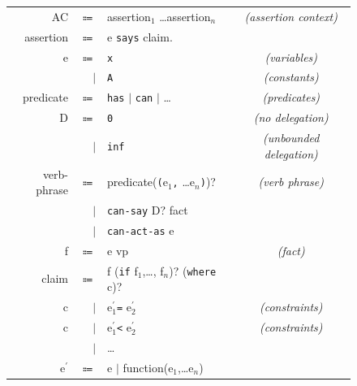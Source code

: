 \documentclass[thesis.tex]{subfiles}
\begin{document}
\newcommand{\bnfcomment}[1]{\slshape{\sffamily(#1)}}
\newcommand{\secpal}[1]{{\color{BrickRed}\texttt{#1}}}
\begin{figure}\footnotesize\centering\sffamily
  \begin{tabular}{r r l c}
    AC         & $\Coloneqq$ & assertion$_1$ \dots assertion$_n$                      & \bnfcomment{assertion context} \\
    assertion  & $\Coloneqq$ & e \secpal{says} claim.                          \\
    e          & $\Coloneqq$ & \secpal{x}                                       & \bnfcomment{variables}         \\
               & $\vert$     & \secpal{A}                                       & \bnfcomment{constants}         \\
    predicate  & $\Coloneqq$ & \secpal{has} $\vert$ \secpal{can} $\vert$ \dots  & \bnfcomment{predicates}        \\
    D          & $\Coloneqq$ & \secpal{0}                                               & \bnfcomment{no delegation}     \\
               & $\vert$     & \secpal{inf}                                        & \bnfcomment{unbounded delegation}        \\
    verb-phrase& $\Coloneqq$ & predicate(\secpal{(}e$_1$\secpal{,} \dots e$_n$\secpal{)})?                          & \bnfcomment{verb phrase}       \\
               & $\vert$     & \secpal{can-say} D? fact                       \\
               & $\vert$     & \secpal{can-act-as}  e                          \\
    f          & $\Coloneqq$ & e vp                                             & \bnfcomment{fact}              \\
    claim      & $\Coloneqq$ & f (\secpal{if} f$_1$,\dots, f$_n$)? (\secpal{where} c)?             \\
    c          & $\vert$     & e$^\prime_1 $\secpal{=} e$^\prime_2$                      & \bnfcomment{constraints}       \\
    c          & $\vert$     & e$^\prime_1 $\secpal{<} e$^\prime_2$                      & \bnfcomment{constraints}       \\
               & $\vert$     & \dots                                           \\
    e$^\prime$ & $\Coloneqq$ & e $\vert$ function(e$_1$,\dots e$_n$)            \\  

\end{tabular}
\end{figure}
\end{document}

